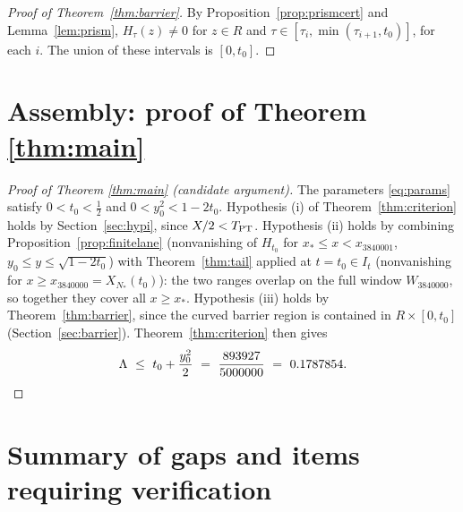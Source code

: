 \documentclass[11pt]{article}
\theoremstyle{definition}
\newcommand{\LB}{\Lambda}
\begin{document}
\begin{proof}[Proof of Theorem~\ref{thm:barrier}]
By Proposition~\ref{prop:prismcert} and Lemma~\ref{lem:prism},
$H_\tau(z)\neq0$ for $z\in R$ and
$\tau\in[\tau_i,\min(\tau_{i+1},t_0)]$, for each $i$. The union of
these intervals is $[0,t_0]$.
\end{proof}

\section{Assembly: proof of Theorem \ref{thm:main}}

\begin{proof}[Proof of Theorem \ref{thm:main} (candidate argument)]
The parameters \eqref{eq:params} satisfy $0<t_0<\frac12$ and
$0<y_0^2<1-2t_0$. Hypothesis (i) of Theorem~\ref{thm:criterion}
holds by Section~\ref{sec:hypi}, since $X/2<T_{\rm PT}$. Hypothesis
(ii) holds by combining Proposition~\ref{prop:finitelane}
(nonvanishing of $H_{t_0}$ for $x_*\le x<x_{3840001}$,
$y_0\le y\le\sqrt{1-2t_0}$) with Theorem~\ref{thm:tail} applied at
$t=t_0\in I_t$ (nonvanishing for $x\ge x_{3840000}=X_{N_*}(t_0)$):
the two ranges overlap on the full window $W_{3840000}$, so together
they cover all $x\ge x_*$. Hypothesis (iii) holds by
Theorem~\ref{thm:barrier}, since the curved barrier region is
contained in $R\times[0,t_0]$
(Section~\ref{sec:barrier}). Theorem~\ref{thm:criterion} then gives
\[
\LB\ \le\ t_0+\frac{y_0^2}{2}\ =\ \frac{893927}{5000000}
\ =\ 0.1787854 . \qedhere
\]
\end{proof}

\section{Summary of gaps and items requiring verification}
\label{sec:gaps}
\end{document}
